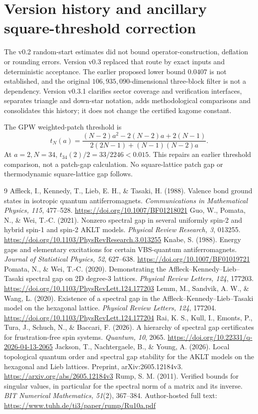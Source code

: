 \documentclass[11pt,a4paper]{article}
\theoremstyle{remark}\newtheorem{remark}[theorem]{Remark}
\begin{document}
\section{Version history and ancillary square-threshold correction}
The v0.2 random-start estimates did not bound operator-construction, deflation or rounding errors. Version v0.3 replaced that route by exact inputs and deterministic acceptance. The earlier proposed lower bound $0.0407$ is not established, and the original $106,935,090$-dimensional three-block filter is not a dependency. Version v0.3.1 clarifies sector coverage and verification interfaces, separates triangle and down-star notation, adds methodological comparisons and consolidates this history; it does not change the certified kagome constant.

The GPW weighted-patch threshold is
\[
 t_N(a)=\frac{(N-2)a^2-2(N-2)a+2(N-1)}{2(2N-1)+(N-1)(N-2)a}.
\]
At $a=2,N=34$, $t_{34}(2)/2=33/2246<0.015$. This repairs an earlier threshold comparison, not a patch-gap calculation. No square-lattice patch gap or thermodynamic square-lattice gap follows.

\clearpage
\begin{thebibliography}{9}
 Affleck, I., Kennedy, T., Lieb, E. H., \& Tasaki, H. (1988). Valence bond ground states in isotropic quantum antiferromagnets. \emph{Communications in Mathematical Physics, 115}, 477--528. \url{https://doi.org/10.1007/BF01218021}
 Guo, W., Pomata, N., \& Wei, T.-C. (2021). Nonzero spectral gap in several uniformly spin-2 and hybrid spin-1 and spin-2 AKLT models. \emph{Physical Review Research, 3}, 013255. \url{https://doi.org/10.1103/PhysRevResearch.3.013255}
 Knabe, S. (1988). Energy gaps and elementary excitations for certain VBS-quantum antiferromagnets. \emph{Journal of Statistical Physics, 52}, 627--638. \url{https://doi.org/10.1007/BF01019721}
 Pomata, N., \& Wei, T.-C. (2020). Demonstrating the Affleck--Kennedy--Lieb--Tasaki spectral gap on 2D degree-3 lattices. \emph{Physical Review Letters, 124}, 177203. \url{https://doi.org/10.1103/PhysRevLett.124.177203}
 Lemm, M., Sandvik, A. W., \& Wang, L. (2020). Existence of a spectral gap in the Affleck--Kennedy--Lieb--Tasaki model on the hexagonal lattice. \emph{Physical Review Letters, 124}, 177204. \url{https://doi.org/10.1103/PhysRevLett.124.177204}
 Rai, K. S., Kull, I., Emonts, P., Tura, J., Schuch, N., \& Baccari, F. (2026). A hierarchy of spectral gap certificates for frustration-free spin systems. \emph{Quantum, 10}, 2065. \url{https://doi.org/10.22331/q-2026-04-13-2065}
 Jackson, T., Nachtergaele, B., \& Young, A. (2026). Local topological quantum order and spectral gap stability for the AKLT models on the hexagonal and Lieb lattices. Preprint, arXiv:2605.12184v3. \url{https://arxiv.org/abs/2605.12184v3}
 Rump, S. M. (2011). Verified bounds for singular values, in particular for the spectral norm of a matrix and its inverse. \emph{BIT Numerical Mathematics, 51}(2), 367--384. Author-hosted full text: \url{https://www.tuhh.de/ti3/paper/rump/Ru10a.pdf}
\end{thebibliography}
\end{document}
